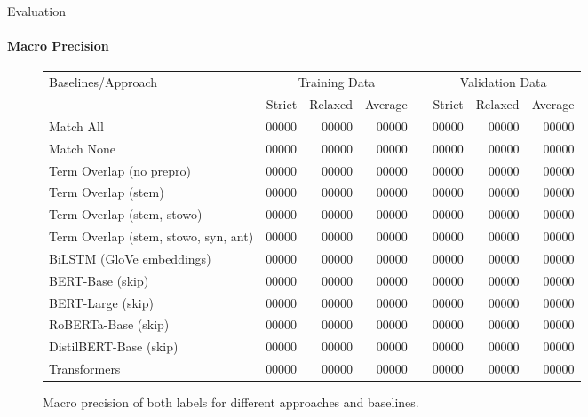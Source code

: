 \documentclass[english,handout]{mlutalk}
\begin{document}
\begin{frame}{Evaluation}
  \framesubtitle{Macro Precision}
  \begin{figure}
    \centering
    \caption{Macro precision of both labels for different approaches and baselines.}
    \tiny
    \begin{tabular}{lrrrlrrr}
      \toprule
      Baselines/Approach & \multicolumn{3}{c}{Training Data} & & \multicolumn{3}{c}{Validation Data}\\ \cmidrule{2-4} \cmidrule{6-8}
        & Strict & Relaxed & Average & & Strict & Relaxed & Average\\
      \midrule
      Match All                           & 00000 & 00000 & 00000 & & 00000 & 00000 & 00000\\
      Match None                          & 00000 & 00000 & 00000 & & 00000 & 00000 & 00000\\
      Term Overlap (no prepro)            & 00000 & 00000 & 00000 & & 00000 & 00000 & 00000\\
      Term Overlap (stem)                 & 00000 & 00000 & 00000 & & 00000 & 00000 & 00000\\
      Term Overlap (stem, stowo)          & 00000 & 00000 & 00000 & & 00000 & 00000 & 00000\\
      Term Overlap (stem, stowo, syn, ant)& 00000 & 00000 & 00000 & & 00000 & 00000 & 00000\\
      \midrule
      BiLSTM (GloVe embeddings)           & 00000 & 00000 & 00000 & & 00000 & 00000 & 00000\\
      BERT-Base (skip)                    & 00000 & 00000 & 00000 & & 00000 & 00000 & 00000\\
      BERT-Large (skip)                   & 00000 & 00000 & 00000 & & 00000 & 00000 & 00000\\
      RoBERTa-Base (skip)                 & 00000 & 00000 & 00000 & & 00000 & 00000 & 00000\\
      DistilBERT-Base (skip)              & 00000 & 00000 & 00000 & & 00000 & 00000 & 00000\\
      Transformers                        & 00000 & 00000 & 00000 & & 00000 & 00000 & 00000\\
      \bottomrule
    \end{tabular}
  \end{figure}
\end{frame}
\end{document}
